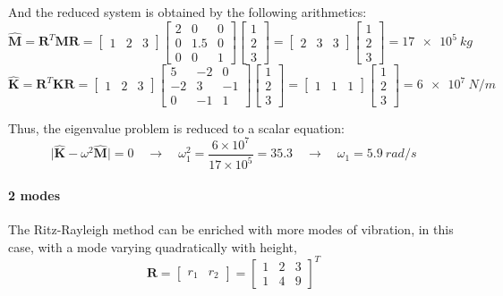 \begin{Answer}[ref={three_storey}]
And the reduced system is obtained by the following arithmetics:
$$
\hat{\mathbf{M}} = \mathbf{R}^T \mathbf{M} \mathbf{R} =
\begin{bmatrix}
    1 & 2 & 3
\end{bmatrix}
\begin{bmatrix}
    2 & 0 & 0 \\
    0 & 1.5 & 0 \\
    0 & 0 & 1
\end{bmatrix}
\begin{bmatrix}
    1 \\ 2 \\ 3
\end{bmatrix} =
\begin{bmatrix}
    2 & 3 & 3
\end{bmatrix}
\begin{bmatrix}
    1 \\ 2 \\ 3
\end{bmatrix} = \SI{17e5}{kg}
$$
$$
\hat{\mathbf{K}} = \mathbf{R}^T \mathbf{K} \mathbf{R} =
\begin{bmatrix}
    1 & 2 & 3
\end{bmatrix}\!
\begin{bmatrix}
    5 & -2 & 0 \\
    -2 & 3 & -1 \\
    0 & -1 & 1
\end{bmatrix}\!
\begin{bmatrix}
    1 \\ 2 \\ 3
\end{bmatrix} =
\begin{bmatrix}
    1 & 1 & 1
\end{bmatrix}\!
\begin{bmatrix}
    1 \\ 2 \\ 3
\end{bmatrix} = \SI{6e7}{N/m}
$$

Thus, the eigenvalue problem is reduced to a scalar equation:
$$
\vert \hat{\mathbf{K}} - \omega^2\hat{\mathbf{M}} \vert = 0 \quad \rightarrow \quad
\omega^2_1 = \frac{6\times 10^7}{17\times 10^5} = 35.3 \quad \rightarrow \quad
\omega_1 = \SI{5.9}{rad/s}
$$


\paragraph{2 modes} The Ritz-Rayleigh method can be enriched with more modes of vibration, in this case, with a mode varying quadratically with height,
$$
\mathbf{R} =
\begin{bmatrix}
    r_1 & r_2
\end{bmatrix} =
\begin{bmatrix}
    1 & 2 & 3 \\
    1 & 4 & 9
\end{bmatrix}^T
$$


\end{Answer}
